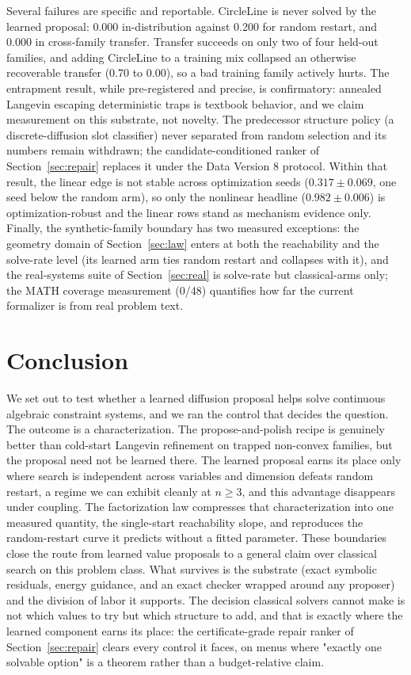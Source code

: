 \documentclass[11pt]{article}
\begin{document}
Several failures are specific and reportable. CircleLine is never solved by the learned
proposal: 0.000 in-distribution against 0.200 for random restart, and 0.000 in cross-family
transfer. Transfer succeeds on only two of four held-out families, and adding CircleLine to a
training mix collapsed an otherwise recoverable transfer (0.70 to 0.00), so a bad training
family actively hurts. The entrapment result, while pre-registered and precise, is
confirmatory: annealed Langevin escaping deterministic traps is textbook behavior, and we
claim measurement on this substrate, not novelty. The predecessor structure policy (a
discrete-diffusion slot classifier) never separated from random selection and its numbers
remain withdrawn; the candidate-conditioned ranker of Section~\ref{sec:repair} replaces it
under the Data Version 8 protocol. Within that result, the linear edge is not stable across
optimization seeds ($0.317 \pm 0.069$, one seed below the random arm), so only the nonlinear
headline ($0.982 \pm 0.006$) is optimization-robust and the linear rows stand as mechanism
evidence only. Finally, the synthetic-family boundary has two measured exceptions: the
geometry domain of Section~\ref{sec:law} enters at both the reachability and the solve-rate
level (its learned arm ties random restart and collapses with it), and the real-systems suite
of Section~\ref{sec:real} is solve-rate but classical-arms only; the MATH coverage measurement
(0/48) quantifies how far the current formalizer is from real problem text.

\section{Conclusion}
\label{sec:conclusion}

We set out to test whether a learned diffusion proposal helps solve continuous algebraic
constraint systems, and we ran the control that decides the question. The outcome is a
characterization. The propose-and-polish recipe is genuinely better than cold-start Langevin
refinement on trapped non-convex families, but the proposal need not be learned there. The
learned proposal earns its place only where search is independent across variables and
dimension defeats random restart, a regime we can exhibit cleanly at $n \ge 3$, and this
advantage disappears under coupling. The factorization law compresses that characterization
into one measured quantity, the single-start reachability slope, and reproduces the
random-restart curve it predicts without a fitted parameter. These boundaries close the route
from learned value proposals to a general claim over classical search on this problem class. What survives is the
substrate (exact symbolic residuals, energy guidance, and an exact checker wrapped around any
proposer) and the division of labor it supports. The decision classical solvers cannot make is
not which values to try but which structure to add, and that is exactly where the learned
component earns its place: the certificate-grade repair ranker of Section~\ref{sec:repair}
clears every control it faces, on menus where "exactly one solvable option" is a theorem
rather than a budget-relative claim.



\end{document}
